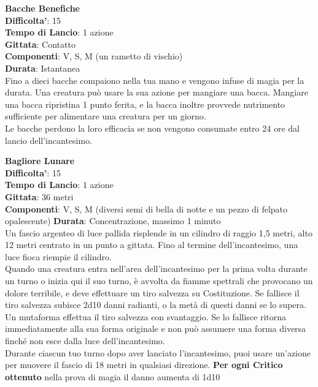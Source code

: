 \begin{multicols}{2}
\medskip\textbf{Bacche Benefiche}\\
\textbf{Difficolta'}: 15\\
\textbf{Tempo di Lancio}: 1 azione\\
\textbf{Gittata}: Contatto\\
\textbf{Componenti}: V, S, M (un rametto di vischio)\\
\textbf{Durata}: Istantanea\\
Fino a dieci bacche compaiono nella tua mano e vengono infuse di magia per la durata. Una creatura può usare la sua azione per mangiare una bacca. Mangiare una bacca ripristina 1 punto ferita, e la bacca inoltre provvede nutrimento sufficiente per alimentare una creatura per un giorno.\\
Le bacche perdono la loro efficacia se non vengono consumate entro 24 ore dal lancio dell’incantesimo. 

\medskip\textbf{Bagliore Lunare}\\
\textbf{Difficolta'}: 15\\
\textbf{Tempo di Lancio}: 1 azione\\
\textbf{Gittata}: 36 metri\\
\textbf{Componenti}: V, S, M (diversi semi di bella di notte e un pezzo di felpato opalescente)
\textbf{Durata}: Concentrazione, massimo 1 minuto\\
Un fascio argenteo di luce pallida risplende in un cilindro di raggio 1,5 metri, alto 12 metri centrato in un punto a gittata. Fino al termine dell’incantesimo, una luce fioca riempie il cilindro. \\
Quando una creatura entra nell’area dell’incantesimo per la prima volta durante un turno o inizia qui il suo turno, è avvolta da fiamme spettrali che provocano un dolore terribile, e deve effettuare un tiro salvezza su Costituzione. Se fallisce il tiro salvezza subisce 2d10 danni radianti, o la metà di questi danni se lo supera. Un mutaforma effettua il tiro salvezza con svantaggio. Se lo fallisce ritorna immediatamente alla sua forma originale e non può assumere una forma diversa finché non esce dalla luce dell’incantesimo.\\
Durante ciascun tuo turno dopo  aver lanciato l’incantesimo, puoi usare un’azione per muovere il
fascio di 18 metri in qualsiasi direzione. 
\textbf{Per ogni Critico ottenuto} nella prova di magia il danno aumenta di 1d10



\end{multicols}
